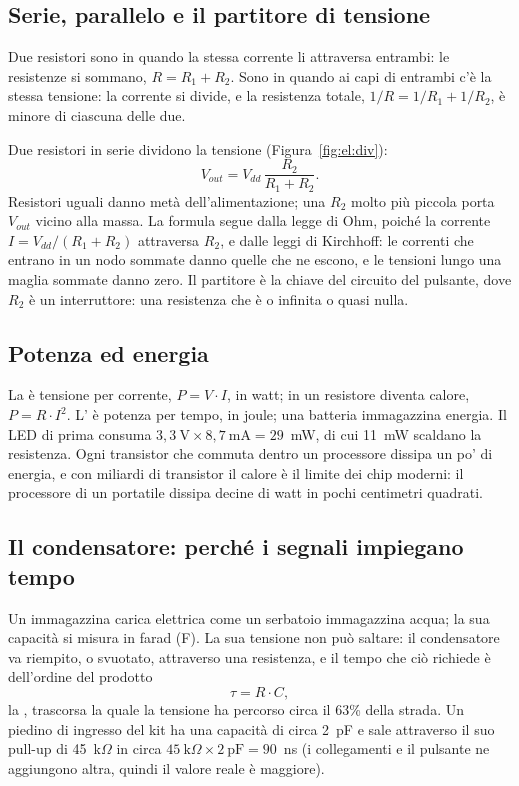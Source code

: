 \subsection{Serie, parallelo e il partitore di tensione}

Due resistori sono in  quando la stessa corrente li attraversa
entrambi: le resistenze si sommano, $R=R_1+R_2$. Sono in 
quando ai capi di entrambi c'è la stessa tensione: la corrente si divide, e la
resistenza totale, $1/R=1/R_1+1/R_2$, è minore di ciascuna delle due.

Due resistori in serie dividono la tensione (Figura~\ref{fig:el:div}):
\begin{equation}\label{eq:el:div}
V_{out} = V_{dd}\,\frac{R_2}{R_1+R_2}.
\end{equation}
Resistori uguali danno metà dell'alimentazione; una $R_2$ molto più piccola
porta $V_{out}$ vicino alla massa. La formula segue dalla legge di Ohm, poiché
la corrente $I=V_{dd}/(R_1+R_2)$ attraversa $R_2$, e dalle leggi di Kirchhoff:
le correnti che entrano in un nodo sommate danno quelle che ne escono, e le
tensioni lungo una maglia sommate danno zero. Il partitore è la chiave del
circuito del pulsante, dove $R_2$ è un interruttore: una resistenza che è o
infinita o quasi nulla.

\subsection{Potenza ed energia}

La  è tensione per corrente, $P=V\cdot I$, in watt; in un
resistore diventa calore, $P=R\cdot I^{2}$. L' è potenza per
tempo, in joule; una batteria immagazzina energia. Il LED di prima consuma
$3,3\ \mathrm{V}\times 8,7\ \mathrm{mA} = 29$~mW, di cui 11~mW scaldano la
resistenza. Ogni transistor che commuta dentro un processore dissipa un po' di
energia, e con miliardi di transistor il calore è il limite dei chip moderni:
il processore di un portatile dissipa decine di watt in pochi centimetri
quadrati.

\subsection{Il condensatore: perché i segnali impiegano tempo}

Un  immagazzina carica elettrica come un serbatoio
immagazzina acqua; la sua capacità si misura in farad (F). La sua tensione non
può saltare: il condensatore va riempito, o svuotato, attraverso una
resistenza, e il tempo che ciò richiede è dell'ordine del prodotto
\[ \tau = R\cdot C, \]
la , trascorsa la quale la tensione ha percorso circa
il 63\% della strada. Un piedino di ingresso del kit ha una capacità di circa
2~pF e sale attraverso il suo pull-up di 45~k$\Omega$ in circa
$45\ \mathrm{k}\Omega\times 2\ \mathrm{pF}=90$~ns (i collegamenti e il pulsante
ne aggiungono altra, quindi il valore reale è maggiore).

